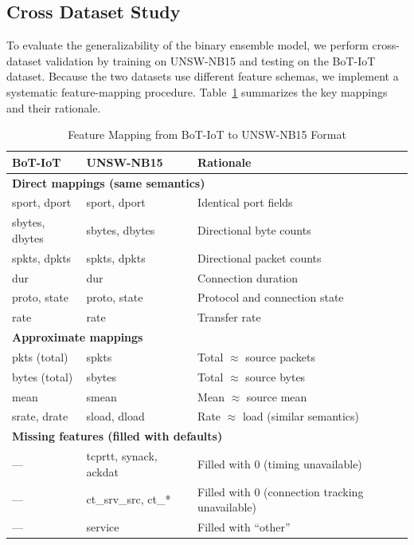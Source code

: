 \documentclass[pdflatex,sn-mathphys-num]{sn-jnl}
\theoremstyle{thmstyleone}%
\theoremstyle{thmstyletwo}%
\theoremstyle{thmstylethree}%
\begin{document}
\subsection{Cross Dataset Study}
To evaluate the generalizability of the binary ensemble model, we perform cross-dataset validation by training on UNSW-NB15 and testing on the BoT-IoT dataset. Because the two datasets use different feature schemas, we implement a systematic feature-mapping procedure. Table~\ref{tab:feature_mapping} summarizes the key mappings and their rationale.

\begin{table}[htbp]
\centering
\caption{Feature Mapping from BoT-IoT to UNSW-NB15 Format}
\label{tab:feature_mapping}
\begin{tabular}{lll}
\toprule
\textbf{BoT-IoT} & \textbf{UNSW-NB15} & \textbf{Rationale} \\
\midrule
\multicolumn{3}{l}{\textbf{Direct mappings (same semantics)}} \\
sport, dport & sport, dport & Identical port fields \\
sbytes, dbytes & sbytes, dbytes & Directional byte counts \\
spkts, dpkts & spkts, dpkts & Directional packet counts \\
dur & dur & Connection duration \\
proto, state & proto, state & Protocol and connection state \\
rate & rate & Transfer rate \\
\midrule
\multicolumn{3}{l}{\textbf{Approximate mappings}} \\
pkts (total) & spkts & Total $\approx$ source packets \\
bytes (total) & sbytes & Total $\approx$ source bytes \\
mean & smean & Mean $\approx$ source mean \\
srate, drate & sload, dload & Rate $\approx$ load (similar semantics) \\
\midrule
\multicolumn{3}{l}{\textbf{Missing features (filled with defaults)}} \\
--- & tcprtt, synack, ackdat & Filled with 0 (timing unavailable) \\
--- & ct\_srv\_src, ct\_* & Filled with 0 (connection tracking unavailable) \\
--- & service & Filled with ``other'' \\
\bottomrule
\end{tabular}
\end{table}
\end{document}
